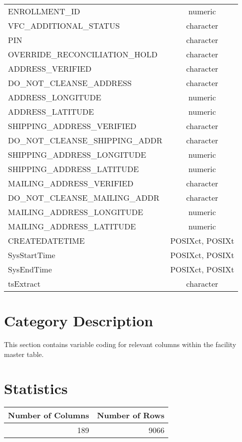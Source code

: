 \documentclass[
  letterpaper,
  DIV=11,
  numbers=noendperiod]{scrreprt}
\begin{document}
\begin{longtable}{lc}
ENROLLMENT\_ID & numeric \\ 
VFC\_ADDITIONAL\_STATUS & character \\ 
PIN & character \\ 
OVERRIDE\_RECONCILIATION\_HOLD & character \\ 
ADDRESS\_VERIFIED & character \\ 
DO\_NOT\_CLEANSE\_ADDRESS & character \\ 
ADDRESS\_LONGITUDE & numeric \\ 
ADDRESS\_LATITUDE & numeric \\ 
SHIPPING\_ADDRESS\_VERIFIED & character \\ 
DO\_NOT\_CLEANSE\_SHIPPING\_ADDR & character \\ 
SHIPPING\_ADDRESS\_LONGITUDE & numeric \\ 
SHIPPING\_ADDRESS\_LATITUDE & numeric \\ 
MAILING\_ADDRESS\_VERIFIED & character \\ 
DO\_NOT\_CLEANSE\_MAILING\_ADDR & character \\ 
MAILING\_ADDRESS\_LONGITUDE & numeric \\ 
MAILING\_ADDRESS\_LATITUDE & numeric \\ 
CREATEDATETIME & POSIXct, POSIXt \\ 
SysStartTime & POSIXct, POSIXt \\ 
SysEndTime & POSIXct, POSIXt \\ 
tsExtract & character \\ 
\bottomrule
\end{longtable}

\hypertarget{category-description-10}{%
\section*{Category Description}\label{category-description-10}}

This section contains variable coding for relevant columns within the
facility master table.

\hypertarget{statistics-10}{%
\section*{Statistics}\label{statistics-10}}

\begin{longtable}{rr}
\toprule
Number of Columns & Number of Rows \\ 
\midrule
189 & 9066 \\ 
\bottomrule
\end{longtable}
\end{document}
